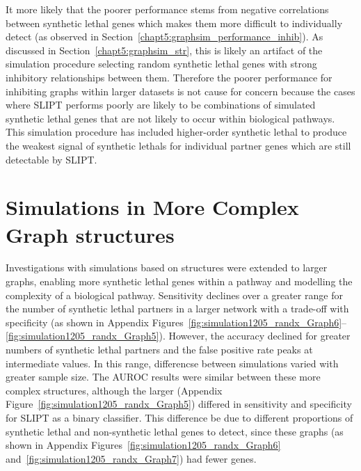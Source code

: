 It more likely that the poorer performance stems from negative correlations between \gls{synthetic lethal} genes which makes them more difficult to individually detect (as observed in Section~\ref{chapt5:graphsim_performance_inhib}). As discussed in Section~\ref{chapt5:graphsim_str}, this is likely an artifact of the simulation procedure selecting random \gls{synthetic lethal} genes with strong inhibitory relationships between them. Therefore the poorer performance for inhibiting \glspl{graph} within larger datasets is not cause for concern because the cases where \gls{SLIPT} performs poorly are likely to be combinations of simulated \gls{synthetic lethal} genes that are not likely to occur within biological pathways. This simulation procedure has included higher-order \gls{synthetic lethal} to produce the weakest signal of \glspl{synthetic lethal} for individual partner genes which are still detectable by \gls{SLIPT}.



\FloatBarrier

\section{Simulations in More Complex Graph structures}
\label{chapt5:complex_graphs}
Investigations with simulations based on  structures were extended to larger \glspl{graph}, enabling more synthetic lethal genes within a pathway and modelling the complexity of a biological pathway. Sensitivity declines over a greater range for the number of \gls{synthetic lethal} partners in a larger network with a trade-off with specificity (as shown in Appendix Figures~\ref{fig:simulation1205_randx_Graph6}\nobreakdash--\ref{fig:simulation1205_randx_Graph5}). However, the accuracy declined for greater numbers of \gls{synthetic lethal} partners and the false positive rate peaks at intermediate values. In this range, differencse between simulations varied with greater sample size. The \gls{AUROC} results were similar between these more complex  structures, although the larger  (Appendix Figure~\ref{fig:simulation1205_randx_Graph5}) differed in sensitivity and specificity for \gls{SLIPT} as a binary classifier. This difference be due to different proportions of \gls{synthetic lethal} and non-synthetic lethal genes to detect, since these \glspl{graph} (as shown in Appendix Figures~\ref{fig:simulation1205_randx_Graph6} and~\ref{fig:simulation1205_randx_Graph7}) had fewer genes. %

